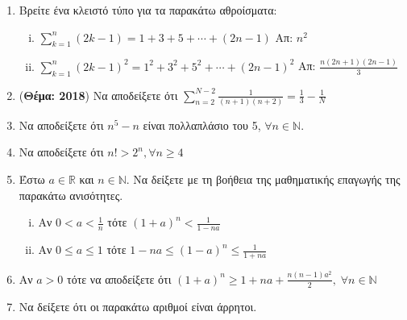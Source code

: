 \documentclass[a4paper,table]{report}
\begin{document}
\begin{enumerate}
    \item \label{ask:sums} Βρείτε ένα κλειστό τύπο για τα παρακάτω 
      αθροίσματα: 
      \begin{enumerate}[i)]
        \item $ \sum_{k=1}^{n} (2k-1) = 1 + 3 + 5 + \cdots + (2n-1)  
          $ \hfill Απ: $ n^{2} $ 

        \item $ \sum_{k=1}^{n} (2k-1)^{2} = 1^{2} + 3^{2} + 5^{2} + \cdots 
          + (2n-1)^{2}  $ \hfill Απ: $ \frac{n(2n+1)(2n-1)}{3} $ 
      \end{enumerate}

    \item \label{ask:thema18sum} ({\bfseries Θέμα: 2018}) Να αποδείξετε ότι 
      $ \sum_{n=2}^{N-2} \frac{1}{(n+1)(n+2)} = \frac{1}{3} - \frac{1}{N} $

    \item Να αποδείξετε ότι $ n^{5} - n $ είναι πολλαπλάσιο του 5,
      $ \forall n \in \mathbb{N} $.

    \item Να αποδείξετε ότι $ n! > 2^{n}, \forall n \geq 4 $

    \item Έστω $ a \in \mathbb{R} $ και $ n \in \mathbb{N} $. Να δείξετε
      με τη βοήθεια της μαθηματικής επαγωγής της παρακάτω ανισότητες.
      \begin{enumerate}[i)]
        \item Αν $ 0<a< \frac{1}{n} $ τότε $ (1+a)^{n} < \frac{1}{1-na} $
        \item Αν $ 0 \leq a \leq 1$  τότε $ 1-na \leq (1-a)^{n} \leq
          \frac{1}{1+na} $
      \end{enumerate}

    \item Αν $a > 0$ τότε να αποδείξετε ότι $ (1+a)^{n} \geq 1 + na + 
      \frac{n(n-1)a^{2}}{2},\; \forall n \in \mathbb{N}   $ 

    \item Να δείξετε ότι οι παρακάτω αριθμοί είναι άρρητοι.
  \end{enumerate}
\end{document}
